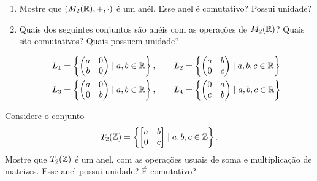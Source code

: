 \documentclass[12pt]{exam}
\begin{document}
    \begin{enumerate}[label=({\alph*})]
        \item Mostre que $(M_2(\mathbb{R}), + , \cdot)$ é um anél. Esse anel é comutativo? Possui unidade?
        \item Quais dos seguintes conjuntos são anéis com as operações de $M_2(\mathbb{R})$? Quais são comutativos? Quais possuem unidade?

        \begin{align*}
            L_1 &= \left\{\begin{pmatrix}
                a & 0\\
                b & 0
            \end{pmatrix} \mid a, b \in \mathbb{R}\right\},\qquad
            L_2 = \left\{\begin{pmatrix}
                a & b\\
                0 & c
            \end{pmatrix} \mid a, b, c \in \mathbb{R}\right\}\\
            L_3 &= \left\{\begin{pmatrix}
                a & 0\\
                0 & b
            \end{pmatrix} \mid a, b \in \mathbb{R}\right\},\qquad
            L_4 = \left\{\begin{pmatrix}
                0 & a\\
                c & b
            \end{pmatrix} \mid a, b, c \in \mathbb{R}\right\}
        \end{align*}
    \end{enumerate}

    \vspace{.3cm}

    \questao{} Considere o conjunto
    \[
     T_2(\mathbb{Z}) = \left\{\begin{bmatrix}a & b\\ 0 & c\end{bmatrix} \mid a, b, c \in \mathbb{Z}\right\}.
    \]
    Mostre que $T_2(\mathbb{Z})$ é um anel, com as operações usuais de soma e multiplicação de matrizes. Esse anel possui unidade? É comutativo?

    \vspace{.3cm}
\end{document}
